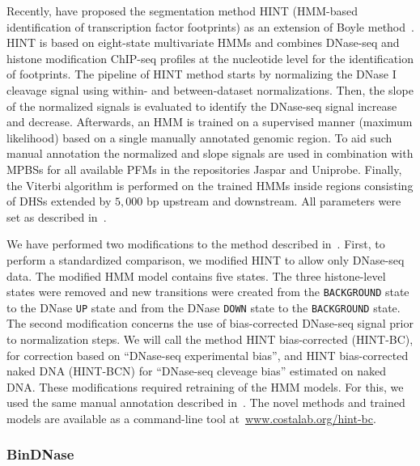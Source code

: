 \documentclass[11pt]{article}
\begin{document}
Recently, \cite{gusmao2014} have proposed the segmentation method HINT (HMM-based identification of transcription factor footprints) as an extension of Boyle method~\citep{boyle2011}. HINT is based on eight-state multivariate HMMs and combines DNase-seq and histone modification ChIP-seq profiles at the nucleotide level for the identification of footprints. The pipeline of HINT method starts by normalizing the DNase I cleavage signal using within- and between-dataset normalizations. Then, the slope of the normalized signals is evaluated to identify the DNase-seq signal increase and decrease. Afterwards, an HMM is trained on a supervised manner (maximum likelihood) based on a single manually annotated genomic region. To aid such manual annotation the normalized and slope signals are used in combination with MPBSs for all available PFMs in the repositories Jaspar and Uniprobe. Finally, the Viterbi algorithm is performed on the trained HMMs inside regions consisting of DHSs extended by $5,000$ bp upstream and downstream. All parameters were set as described in~\cite{gusmao2014}.

We have performed two modifications to the method described in~\cite{gusmao2014}. First, to perform a standardized comparison, we modified HINT to allow only DNase-seq data. The modified HMM model contains five states. The three histone-level states were removed and new transitions were created from the {\tt BACKGROUND} state to the DNase {\tt UP} state and from the DNase {\tt DOWN} state to the {\tt BACKGROUND} state. The second modification concerns the use of bias-corrected DNase-seq signal prior to normalization steps. We will call the method HINT bias-corrected (HINT-BC), for correction based on ``DNase-seq experimental bias'', and HINT bias-corrected naked DNA (HINT-BCN) for ``DNase-seq cleveage bias'' estimated on naked DNA. These modifications required retraining of the HMM models. For this, we used the same manual annotation described in~\cite{gusmao2014}. The novel methods and trained models are available as a command-line tool at~\url{www.costalab.org/hint-bc}.

\subsubsection{BinDNase}
\label{sec:bindnase}
\end{document}
